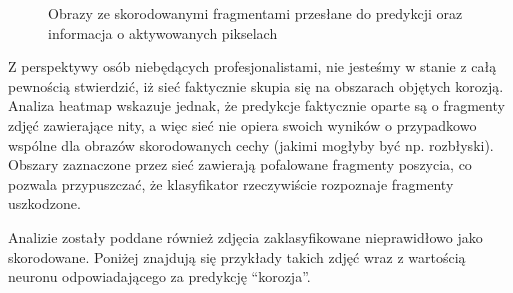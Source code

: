 \documentclass[polish,12pt]{aghthesis}
\begin{document}
\begin{figure}[H]
    \ContinuedFloat
    \begin{adjustbox}{minipage=1.0\paperwidth, pagecenter}
    \centering
    \qquad
    \end{adjustbox}
    \caption{Obrazy ze skorodowanymi fragmentami przesłane do predykcji oraz informacja o aktywowanych pikselach}
\end{figure}

\par Z perspektywy osób niebędących profesjonalistami, nie jesteśmy w stanie z całą pewnością stwierdzić, iż sieć faktycznie skupia się na obszarach objętych korozją. Analiza heatmap wskazuje jednak, że predykcje faktycznie oparte są o fragmenty zdjęć zawierające nity, a więc sieć nie opiera swoich wyników o przypadkowo wspólne dla obrazów skorodowanych cechy (jakimi mogłyby być np. rozbłyski). Obszary zaznaczone przez sieć zawierają pofalowane fragmenty poszycia, co pozwala przypuszczać, że klasyfikator rzeczywiście rozpoznaje fragmenty uszkodzone.

\par Analizie zostały poddane również zdjęcia zaklasyfikowane nieprawidłowo jako skorodowane. Poniżej znajdują się przykłady takich zdjęć wraz z wartością neuronu odpowiadającego za predykcję ``korozja''.
\end{document}
